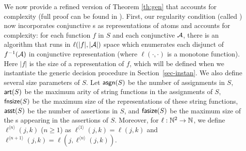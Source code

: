 %


We now provide a refined version of Theorem \ref{th:gen} that accounts for
complexity (full proof can be found in ). First,
our regularity condition (called \prerec{}) now incorporates conjunctive
\FA{}s as representations of atoms and accounts for complexity:
for each function $f$ in $S$ and each conjunctive \FA{} $\mathcal{A}$,
there is an algorithm that runs in $\ell(|f|,|\mathcal{A}|)$ space which enumerates 
each disjunct of $f^{-1}(\mathcal{A})$ in conjunctive representation (where $\ell(\cdot, \cdot)$ is a monotone function).
%
%
Here $|f|$ is the size of a representation of $f$, which will be defined
when we
%
instantiate the generic decision procedure in Section~\ref{sec-instan}.
We also define several size parameters of $S$.
Let $\mathsf{asgn}(S)$ be the number of assignments in $S$, $\mathsf{art}(S)$ be the maximum arity of string functions in the assignments of $S$, $\mathsf{fnsize}(S)$ 
be the maximum size of the representations of these string functions,  $\mathsf{asst}(S)$ be the number of assertions in $S$,
and $\mathsf{fasize}(S)$ be the maximum size of the \FA{}s appearing in the assertions of 
$S$.
Moreover,
for $\ell:\mathbb{N}^2\rightarrow \mathbb{N}$, we define $\ell^{\langle n \rangle}(j, k)$ ($n\geq 1$) as $\ell^{\langle 1 \rangle}(j,k)= \ell(j, k)$ and $\ell^{\langle n+1 \rangle }(j, k) = \ell(j, \ell^{\langle n \rangle}(j,k))$. 

